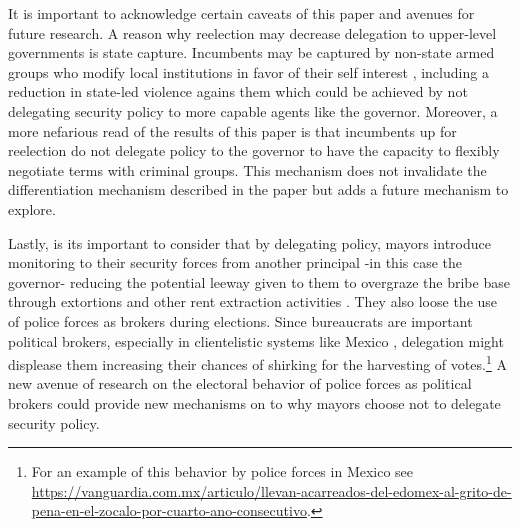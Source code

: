 \documentclass[12pt]{amsart}
\numberwithin{equation}{section}
\theoremstyle{definition}
\theoremstyle{definition}
\theoremstyle{definition}
\begin{document}
It is important to acknowledge certain caveats of this paper and avenues for future research. A reason why reelection may decrease delegation to upper-level governments is state capture. %
Incumbents may be captured by non-state armed groups who modify local institutions in favor of their self interest \citep{ch_etal_2018}, including a reduction in state-led violence agains them which could be achieved by not delegating security policy to more capable agents like the governor.  Moreover, a more nefarious read of the results of this paper is that incumbents up for reelection  do not delegate policy to the governor to have the capacity to flexibly negotiate terms with criminal groups. This mechanism does not invalidate the differentiation mechanism described in the paper but adds a future mechanism to explore. 

Lastly, is its important to consider that by delegating policy, mayors introduce monitoring to their security forces from another principal -in this case the governor- reducing the potential leeway given to them to overgraze the bribe base through extortions and other rent extraction activities \citep{schleifer_vishny_1993}. They also loose the use of police forces as brokers during elections. Since bureaucrats are important political brokers, especially in clientelistic systems like Mexico \citep{larreguy_etal_2017}, delegation might displease them increasing their chances of shirking for the harvesting of votes.\footnote{For an example of this behavior by police forces in Mexico see \url{https://vanguardia.com.mx/articulo/llevan-acarreados-del-edomex-al-grito-de-pena-en-el-zocalo-por-cuarto-ano-consecutivo}.} A new avenue of research on the electoral behavior of police forces as political brokers could provide new mechanisms on to why mayors choose not to delegate security policy.
           


\clearpage
   
\end{document}
